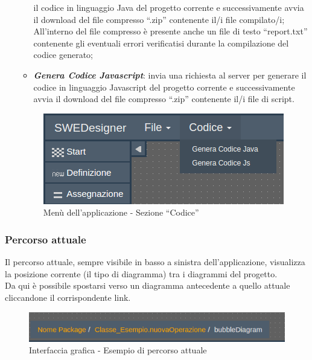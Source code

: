 \documentclass[../ManualeUtente.tex]{subfiles}
\begin{document}
\begin{itemize}
\begin{itemize}
						il codice in linguaggio Java del progetto corrente e successivamente avvia il
						download del file compresso ``.zip'' contenente il/i file compilato/i; All'interno del file
						compresso è presente anche un file di testo ``report.txt'' contenente gli eventuali errori
						verificatisi durante la compilazione del codice generato;
						\item \textit{\textbf{Genera Codice Javascript}}: invia una richiesta al server per
						generare il codice in linguaggio Javascript del progetto corrente e successivamente
						avvia il download del file compresso ``.zip'' contenente il/i file di script.
					\end{itemize}
					\begin{figure} [h!]
						\centering
						\includegraphics[scale=0.5]{./Immagini/AppCode.png}
						\caption{Menù dell'applicazione - Sezione ``Codice''}\label{fig:AppCode}
					\end{figure}
				\end{itemize}
			\subsubsection{Percorso attuale}\label{sez:Path}
				Il percorso attuale, sempre visibile in basso a sinistra dell'applicazione, visualizza la
				posizione corrente (il tipo di diagramma) tra i diagrammi del progetto.\\
				Da qui è possibile spostarsi verso un diagramma
				antecedente a quello attuale cliccandone il corrispondente link.
				\begin{figure} [h!]
					\centering
					\includegraphics[scale=0.5]{./Immagini/AppPath.png}
					\caption{Interfaccia grafica - Esempio di percorso attuale}\label{fig:AppPath}
				\end{figure}
		\newpage
\end{document}
